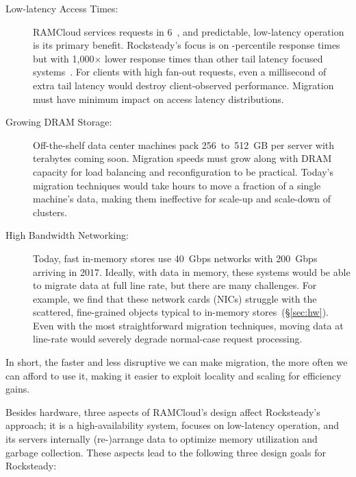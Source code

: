 \begin{description}
\item[Low-latency Access Times:]
RAMCloud services requests in 6~\us, and predictable, low-latency operation is
its primary benefit.  Rocksteady's focus is on \nnnth{}-percentile response
times but with 1,000$\times$ lower response times than other tail latency
focused systems~\cite{dynamo}. For clients with high fan-out requests, even
a millisecond of extra tail latency would destroy client-observed
performance. Migration must have minimum impact on access latency
distributions.

\item[Growing DRAM Storage:]
Off-the-shelf data center machines pack 256~to~512~GB per server
with terabytes coming soon. Migration speeds must
grow along with DRAM capacity for load balancing and reconfiguration to be
practical. Today's migration techniques would take hours
to move a fraction of a single machine's data, making them ineffective for
scale-up and scale-down of clusters.

\item[High Bandwidth Networking:]
Today, fast in-memory stores use 40~Gbps networks with
200~Gbps~\cite{mellanox-cx6} arriving in 2017. Ideally, with data in memory, these
systems would be able to migrate data at full line rate, but there are many
challenges. For example, we find that these network cards (NICs)
struggle with the scattered, fine-grained objects typical to in-memory
stores~(\S\ref{sec:hw}).  Even with the most straightforward migration
techniques, moving data at line-rate would severely degrade
normal-case request processing.

\end{description}

\noindent
In short, the faster and less disruptive we can make migration, the more often we can
afford to use it, making it easier to exploit locality and scaling for efficiency gains.

Besides hardware, three aspects of RAMCloud's design affect Rocksteady's
approach; it is a high-availability system, focuses on low-latency
operation, and its servers internally (re-)arrange data to optimize memory
utilization and garbage collection. These aspects lead to the following
three design goals for Rocksteady:

